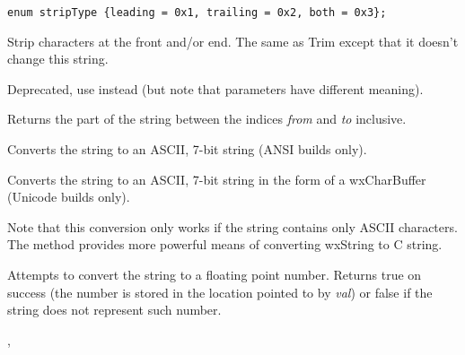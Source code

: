 \label{wxstringstrip}

\begin{verbatim}
enum stripType {leading = 0x1, trailing = 0x2, both = 0x3};
\end{verbatim}


Strip characters at the front and/or end. The same as Trim except that it
doesn't change this string.

\label{wxstringsubstring}


Deprecated, use  instead (but note that parameters
have different meaning).

Returns the part of the string between the indices {\it from} and {\it to}
inclusive.

\label{wxstringtoascii}


Converts the string to an ASCII, 7-bit string (ANSI builds only).


Converts the string to an ASCII, 7-bit string in the form of
a wxCharBuffer (Unicode builds only).

Note that this conversion only works if the string contains only ASCII
characters. The  method provides more
powerful means of converting wxString to C string.

\label{wxstringtodouble}


Attempts to convert the string to a floating point number. Returns true on
success (the number is stored in the location pointed to by {\it val}) or false
if the string does not represent such number.


,\\

\label{wxstringtolong}


